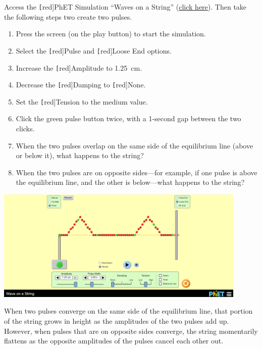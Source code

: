 \documentclass[main.tex]{subfiles}
\begin{document}
\begin{example} \label{OIqgoJ}
    Access the \texttt[red]{PhET Simulation} ``Waves on a String'' (\href{https://phet.colorado.edu/en/simulations/wave-on-a-string}{click here}). Then take the following steps two create two pulses.
    
    \begin{enumerate}
    \setlength\itemsep{0.1ex}
        \item Press the screen (on the play button) to start the simulation.
        \item Select the \texttt[red]{Pulse} and \texttt[red]{Loose End} options.
        \item Increase the \texttt[red]{Amplitude} to \SI{1.25}{cm}.
        \item Decrease the \texttt[red]{Damping} to \texttt[red]{None}.
        \item Set the \texttt[red]{Tension} to the medium value.
        \item Click the green pulse button twice, with a 1-second gap between the two clicks.
        \item When the two pulses overlap on the same side of the equilibrium line (above or below it), what happens to the string?
        \item When the two pulses are on opposite sides---for example, if one pulse is above the equilibrium line, and the other is below---what happens to the string?
    \end{enumerate}

    \begin{center}
        \includegraphics[width=12cm]{figures/Unit11_PhET_Wave2.png}
    \end{center}
\end{example}

\Solution When two pulses converge on the same side of the equilibrium line, that portion of the string grows in height as the amplitudes of the two pulses add up. However, when pulses that are on opposite sides converge, the string momentarily flattens as the opposite amplitudes of the pulses cancel each other out.
\end{document}
